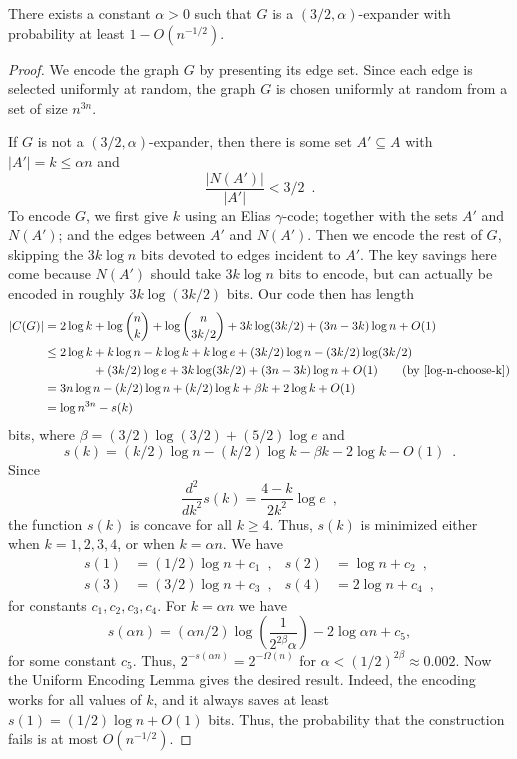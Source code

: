 \documentclass{patmorin}
\begin{document}
\begin{thm}
  There exists a constant $\alpha >0$ such that $G$ is a
  $(3/2,\alpha)$-expander with probability at least $1 - O(n^{-1/2})$.
\end{thm}

\begin{proof}
  We encode the graph $G$ by presenting its edge set. Since each edge
  is selected uniformly at random, the graph $G$ is chosen uniformly at
  random from a set of size $n^{3n}$.
  
  If $G$ is not a $(3/2, \alpha)$-expander, then there is some set $A'
  \subseteq A$ with $|A'|=k\le \alpha n$ and
  \[
  \frac{|N(A')|}{|A'|} < 3/2 \enspace .
  \]
  To encode $G$, we first give $k$ using an Elias $\gamma$-code; together 
  with the sets $A'$ and $N(A')$; and the edges between $A'$ and
  $N(A')$. Then we encode the rest of $G$, skipping the $3k\log n$
  bits devoted to edges incident to $A'$.  The key savings here come 
  because
  $N(A')$ should take $3k\log n$ bits to encode, but can actually be
  encoded in roughly $3k\log(3k/2)$ bits. Our code then has length
  \begin{align*}
    |C(G)| &= 2\log k + \log {n \choose k} + \log {n \choose 3k/2} + 3k \log (3k/2) + (3n - 3k) \log n + O(1) \\
           &\le 2\log k + k\log n - k\log k + k\log e + (3k/2)\log n - (3k/2) \log (3k/2) \\
           & \hphantom{{}=2\log k} + (3k/2) \log e + 3k \log (3k/2) + (3n - 3k) \log n + O(1) \tag{by \eqref{log-n-choose-k}} \\
           &= 3n\log n - (k/2)\log n + (k/2)\log k + \beta k + 2\log k + O(1) \\
           &= \log n^{3n} - s(k)
  \end{align*}
  bits, where $\beta = (3/2) \log (3/2) + (5/2) \log e$ and
  \[
  s(k) = (k/2)\log n - (k/2)\log k - \beta k -
  2 \log k - O(1) \enspace.
  \]
  Since
  \[
    \frac{d^2}{dk^2} s(k) = \frac{4 - k}{2 k^2} \log e \enspace ,
  \]
  the function $s(k)$ is concave for all $k \geq 4$. Thus, $s(k)$ is
  minimized either when $k = 1, 2, 3, 4$, or when $k = \alpha n$. We have
  \begin{align*}
    s(1) &= (1/2)\log n + c_1 \enspace , & 
    s(2) &= \log n + c_2 \enspace , \\
    s(3) &= (3/2) \log n + c_3 \enspace , &
    s(4) &= 2 \log n + c_4 \enspace ,
  \end{align*}
  for constants $c_1, c_2, c_3, c_4$. For $k=\alpha n$ we have
  \[
    s(\alpha n) = (\alpha n/2)\log \left(\frac{1}{2^{2\beta}
        \alpha}\right) - 2 \log \alpha n + c_5,
  \]
  for some constant $c_5$.
  Thus, $2^{-s(\alpha n)} = 2^{-\varOmega(n)}$ for
  $\alpha < (1/2)^{2\beta} \approx 0.002$. Now the Uniform Encoding
  Lemma gives the desired result. Indeed, the encoding works
  for all values of $k$, and it always saves at least 
  $s(1) = (1/2)\log n + O(1)$ bits.
  Thus, the probability that the construction fails is
  at most $O(n^{-1/2})$.
\end{proof}
\end{document}

